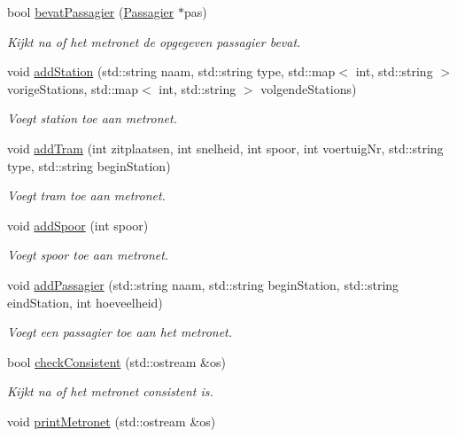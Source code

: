 \begin{DoxyCompactItemize}
bool \hyperlink{class_metronet_a61ae688a6fc54bc4550bcb71f36715cf}{bevat\+Passagier} (\hyperlink{class_passagier}{Passagier} $\ast$pas)
\begin{DoxyCompactList}\small\item\em Kijkt na of het metronet de opgegeven passagier bevat. \end{DoxyCompactList}\item 
void \hyperlink{class_metronet_ab2cbe114faa2ee312f6ea4e551962193}{add\+Station} (std\+::string naam, std\+::string type, std\+::map$<$ int, std\+::string $>$ vorige\+Stations, std\+::map$<$ int, std\+::string $>$ volgende\+Stations)
\begin{DoxyCompactList}\small\item\em Voegt station toe aan metronet. \end{DoxyCompactList}\item 
void \hyperlink{class_metronet_a2d87bbeb977db9176f94116a02b9b17e}{add\+Tram} (int zitplaatsen, int snelheid, int spoor, int voertuig\+Nr, std\+::string type, std\+::string begin\+Station)
\begin{DoxyCompactList}\small\item\em Voegt tram toe aan metronet. \end{DoxyCompactList}\item 
void \hyperlink{class_metronet_a0422381a8d7f32a915e0ad966af43627}{add\+Spoor} (int spoor)
\begin{DoxyCompactList}\small\item\em Voegt spoor toe aan metronet. \end{DoxyCompactList}\item 
void \hyperlink{class_metronet_a94aabe02de1f82f95a8f19aac2c0bd12}{add\+Passagier} (std\+::string naam, std\+::string begin\+Station, std\+::string eind\+Station, int hoeveelheid)
\begin{DoxyCompactList}\small\item\em Voegt een passagier toe aan het metronet. \end{DoxyCompactList}\item 
bool \hyperlink{class_metronet_a3125e980b208f1cdd04a9c26ec92a7bf}{check\+Consistent} (std\+::ostream \&os)
\begin{DoxyCompactList}\small\item\em Kijkt na of het metronet consistent is. \end{DoxyCompactList}\item 
void \hyperlink{class_metronet_a3d8b85c241fff3a9353c06320226e84e}{print\+Metronet} (std\+::ostream \&os)

\end{DoxyCompactItemize}
